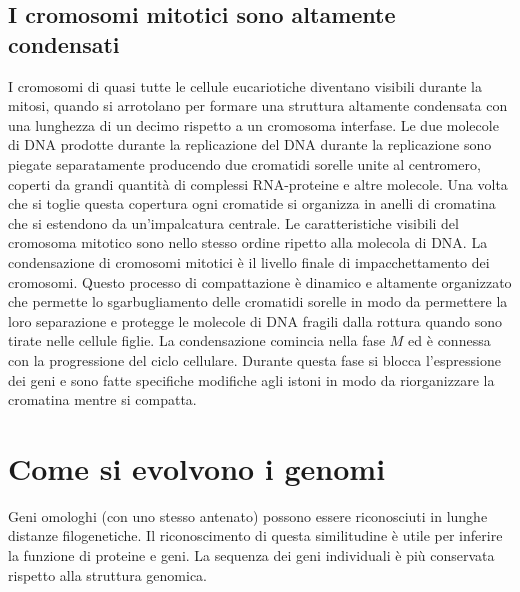 \subsection{I cromosomi mitotici sono altamente condensati}
I cromosomi di quasi tutte le cellule eucariotiche diventano visibili durante la mitosi, quando si arrotolano per formare una struttura altamente condensata con una lunghezza di un
decimo rispetto a un cromosoma interfase. Le due molecole di DNA prodotte durante la replicazione del DNA durante la replicazione sono piegate separatamente producendo due cromatidi 
sorelle unite al centromero, coperti da grandi quantit\`a di complessi RNA-proteine e altre molecole. Una volta che si toglie questa copertura ogni cromatide si organizza in anelli di 
cromatina che si estendono da un'impalcatura centrale. Le caratteristiche visibili del cromosoma mitotico sono nello stesso ordine ripetto alla molecola di DNA. La condensazione di 
cromosomi mitotici \`e il livello finale di impacchettamento dei cromosomi. Questo processo di compattazione \`e dinamico e altamente organizzato che permette lo sgarbugliamento delle
cromatidi sorelle in modo da permettere la loro separazione e protegge le molecole di DNA fragili dalla rottura quando sono tirate nelle cellule figlie. La condensazione comincia nella
fase $M$ ed \`e connessa con la progressione del ciclo cellulare. Durante questa fase si blocca l'espressione dei geni e sono fatte specifiche modifiche agli istoni in modo da 
riorganizzare la cromatina mentre si compatta. 
\section{Come si evolvono i genomi}
Geni omologhi (con uno stesso antenato) possono essere riconosciuti in lunghe distanze filogenetiche. Il riconoscimento di questa similitudine \`e utile per inferire la funzione di 
proteine e geni. La sequenza dei geni individuali \`e pi\`u conservata rispetto alla struttura genomica. 
